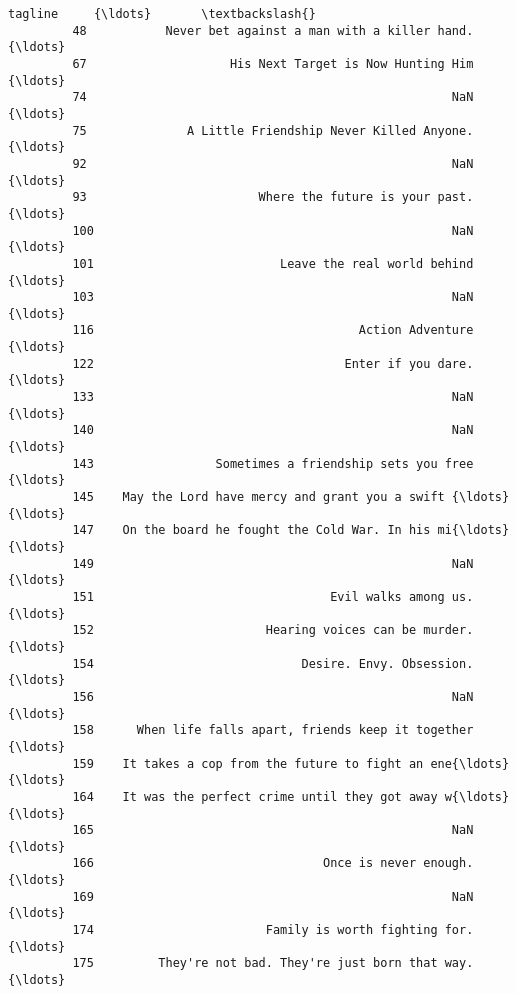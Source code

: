 \documentclass[11pt]{article}
\begin{document}
\begin{Verbatim}[commandchars=\\\{\}]
                                                          tagline     {\ldots}       \textbackslash{}
         48           Never bet against a man with a killer hand.     {\ldots}        
         67                    His Next Target is Now Hunting Him     {\ldots}        
         74                                                   NaN     {\ldots}        
         75              A Little Friendship Never Killed Anyone.     {\ldots}        
         92                                                   NaN     {\ldots}        
         93                        Where the future is your past.     {\ldots}        
         100                                                  NaN     {\ldots}        
         101                          Leave the real world behind     {\ldots}        
         103                                                  NaN     {\ldots}        
         116                                     Action Adventure     {\ldots}        
         122                                   Enter if you dare.     {\ldots}        
         133                                                  NaN     {\ldots}        
         140                                                  NaN     {\ldots}        
         143                 Sometimes a friendship sets you free     {\ldots}        
         145    May the Lord have mercy and grant you a swift {\ldots}     {\ldots}        
         147    On the board he fought the Cold War. In his mi{\ldots}     {\ldots}        
         149                                                  NaN     {\ldots}        
         151                                 Evil walks among us.     {\ldots}        
         152                        Hearing voices can be murder.     {\ldots}        
         154                             Desire. Envy. Obsession.     {\ldots}        
         156                                                  NaN     {\ldots}        
         158      When life falls apart, friends keep it together     {\ldots}        
         159    It takes a cop from the future to fight an ene{\ldots}     {\ldots}        
         164    It was the perfect crime until they got away w{\ldots}     {\ldots}        
         165                                                  NaN     {\ldots}        
         166                                Once is never enough.     {\ldots}        
         169                                                  NaN     {\ldots}        
         174                        Family is worth fighting for.     {\ldots}        
         175         They're not bad. They're just born that way.     {\ldots}        

\end{Verbatim}
\end{document}
